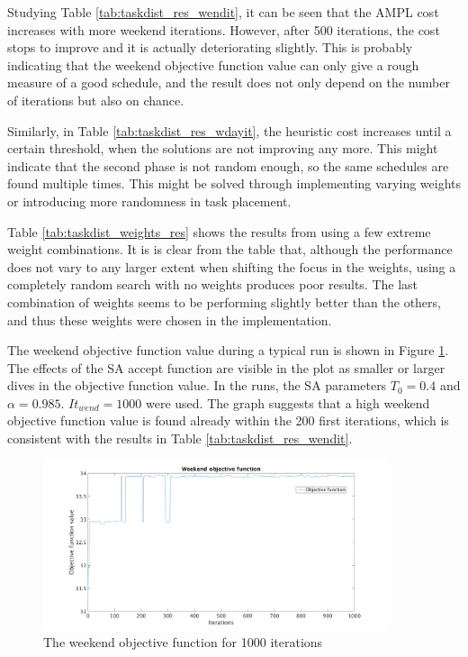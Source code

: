 Studying Table \ref{tab:taskdist_res_wendit}, it can be seen that the AMPL cost increases with more weekend iterations. However, after 500 iterations, the cost stops to improve and it is actually deteriorating slightly. This is probably indicating that the weekend objective function value can only give a rough measure of a good schedule, and the result does not only depend on the number of iterations but also on chance. 

Similarly, in Table \ref{tab:taskdist_res_wdayit}, the heuristic cost increases until a certain threshold, when the solutions are not improving any more. This might indicate that the second phase is not random enough, so the same schedules are found multiple times. This might be solved through implementing varying weights or introducing more randomness in task placement.

Table \ref{tab:taskdist_weights_res} shows the results from using a few extreme weight combinations. It is is clear from the table that, although the performance does not vary to any larger extent when shifting the focus in the weights, using a completely random search with no weights produces poor results. The last combination of weights seems to be performing slightly better than the others, and thus these weights were chosen in the implementation.

The weekend objective function value during a typical run is shown in Figure \ref{fig:obj_fun_vals}. The effects of the SA accept function are visible in the plot as smaller or larger dives in the objective function value. In the runs, the SA parameters $T_0 = 0.4$ and $\alpha = 0.985$. $It_{wend} = 1000$ were used. The graph suggests that a high weekend objective function value is found already within the 200 first iterations, which is consistent with the results in Table \ref{tab:taskdist_res_wendit}.

\begin{figure}[!htbp]
\centering
\includegraphics[width=0.9\textwidth, trim = 100px 0px 100px 20px, clip]{Chapters/ImagesEmelie/Plot_1000_20.png}
\caption{The weekend objective function for 1000 iterations}
\label{fig:obj_fun_vals}
\end{figure}


